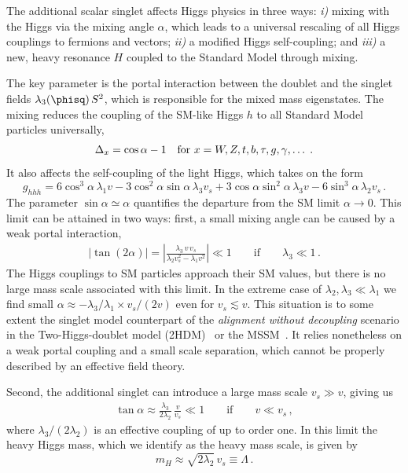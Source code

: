 The additional scalar singlet affects Higgs physics in three ways:
\textit{i)} mixing with the Higgs via the mixing angle $\alpha$, which
leads to a universal rescaling of all Higgs couplings to fermions and
vectors; \textit{ii)} a modified Higgs self-coupling; and
\textit{iii)} a new, heavy resonance $H$ coupled to the Standard Model
through mixing.

The key parameter is the portal interaction between the doublet and
the singlet fields $\lambda_3(\phisq)\,S^2$, which is responsible for
the mixed mass eigenstates.  The mixing reduces the coupling of the
SM-like Higgs $h$ to all Standard Model particles universally,
%
\begin{align} \Delta_x = \cos\alpha -1 \quad \text{for
$x=W,Z,t,b,\tau,g,\gamma,\dots$\;.}
\label{eq:singlet-shift}
\end{align}
% 
It also affects the self-coupling of the light Higgs, which takes on
the form
\begin{equation} g_{hhh} = 6 \cos^3 \alpha\, \lambda_1 v - 3 \cos^2
\alpha \sin \alpha\, \lambda_3 v_s + 3 \cos \alpha \sin^2 \alpha\,
\lambda_3 v - 6 \sin^3 \alpha\, \lambda_2 v_s \,.
\end{equation}
%
The parameter $\sin\alpha \simeq \alpha$ quantifies the departure from
the SM limit $\alpha \to 0$.  This limit can be attained in two ways:
first, a small mixing angle can be caused by a weak portal
interaction,
%
\begin{align} \left| \tan(2\alpha) \right| = \left|
\frac{\lambda_3\,v\,v_s}{\lambda_2 v_s^2 - \lambda_1 v^2} \right| \ll
1 \qquad \text{if} \qquad \lambda_3 \ll 1 \,.
\label{eq:limit1}
\end{align}
%
The Higgs couplings to SM particles approach their SM values, but
there is no large mass scale associated with this limit. In the
extreme case of $\lambda_2,\lambda_3 \ll \lambda_1$ we find small
$\alpha \approx - \lambda_3/\lambda_1 \times v_s/(2v)$ even for $v_s
\lesssim v$.  This situation is to some extent the singlet model
counterpart of the \textit{alignment without decoupling} scenario in
the Two-Higgs-doublet model (2HDM)~\cite{Gunion:2002zf,Craig:2013hca}
or the MSSM~\cite{Carena:2013ooa,Delgado:2013zfa}.  It relies
nonetheless on a weak portal coupling and a small scale separation,
which cannot be properly described by an effective field theory.

Second, the additional singlet can introduce a large mass scale $v_s
\gg v$, giving us
% 
\begin{align} \tan\alpha \approx
\frac{\lambda_3}{2\lambda_2}\,\frac{v}{v_s} \ll 1 \qquad \text{if}
\qquad v \ll v_s \,,
\label{eq:limit2}
\end{align}
% 
where $\lambda_3/(2\lambda_2)$ is an effective coupling of up to order
one. In this limit the heavy Higgs mass, which we identify as the
heavy mass scale, is given by
\begin{equation} m_H \approx \sqrt{2\lambda_2} \, v_s \equiv \Lambda
\,.
\end{equation}

